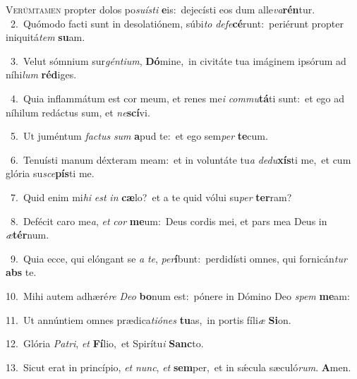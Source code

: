 \lettrine{\initial\textcolor{\initialcolor}{V}}{erúmtamen} propter dolos po\-\textit{su}\-\textit{ís}\textit{ti} \textbf{e}\-is:~\star dejecísti eos dum alle\-\textit{va}\-\textbf{rén}tur.\\
{\numbfont\textcolor{\numbcolor}{~2.}}~Quómodo facti sunt in desolatiónem, súbi\textit{to} \textit{de}\-\textit{fe}\textbf{cé}runt:~\star periérunt propter iniquitá\textit{tem} \textbf{su}\-am.\par
{\numbfont\textcolor{\numbcolor}{~3.}}~Velut sómnium sur\-\textit{gén}\-\textit{ti}\textit{um}, \textbf{Dó}\-mine,~\star in civitáte tua imáginem ipsórum ad níhi\textit{lum} \textbf{réd}\-iges.\par
{\numbfont\textcolor{\numbcolor}{~4.}}~Quia inflammátum est cor meum, et renes me\textit{i} \textit{com}\-\textit{mu}\textbf{tá}ti sunt:~\star et ego ad níhilum redáctus sum, et \textit{ne}\-\textbf{scí}vi.\par
{\numbfont\textcolor{\numbcolor}{~5.}}~Ut juméntum \textit{fac}\-\textit{tus} \textit{sum} \textbf{a}\-pud te:~\star et ego sem\textit{per} \textbf{te}\-cum.\par
{\numbfont\textcolor{\numbcolor}{~6.}}~Tenuísti manum déxteram meam:~\dagger et in voluntáte tu\textit{a} \textit{de}\-\textit{du}\textbf{xís}ti me,~\star et cum glória su\-\textit{sce}\-\textbf{pís}ti me.\par
{\numbfont\textcolor{\numbcolor}{~7.}}~Quid enim mi\textit{hi} \textit{est} \textit{in} \textbf{cæ}\-lo?~\star et a te quid vólui su\textit{per} \textbf{ter}\-ram?\par
{\numbfont\textcolor{\numbcolor}{~8.}}~Defécit caro me\-\textit{a}\-, \textit{et} \textit{cor} \textbf{me}\-um:~\star Deus cordis mei, et pars mea Deus in \textit{æ}\-\textbf{tér}num.\par
{\numbfont\textcolor{\numbcolor}{~9.}}~Quia ecce, qui elóngant se \textit{a} \textit{te}\-, \textit{per}\-\textbf{í}bunt:~\star perdidísti omnes, qui fornicán\textit{tur} \textbf{abs} te.\par
{\numbfont\textcolor{\numbcolor}{10.}}~Mihi autem adhæré\textit{re} \textit{De}\-\textit{o} \textbf{bo}\-num est:~\star pónere in Dómino Deo \textit{spem} \textbf{me}\-am:\par
{\numbfont\textcolor{\numbcolor}{11.}}~Ut annúntiem omnes prædica\-\textit{ti}\-\textit{ó}\textit{nes} \textbf{tu}\-as,~\star in portis fíli\textit{æ} \textbf{Si}\-on.\par
{\numbfont\textcolor{\numbcolor}{12.}}~Glória \textit{Pa}\-\textit{tri}, \textit{et} \textbf{Fí}\-lio,~\star et Spirítu\textit{i} \textbf{Sanc}\-to.\par
{\numbfont\textcolor{\numbcolor}{13.}}~Sicut erat in princípio, \textit{et} \textit{nunc}\-, \textit{et} \textbf{sem}\-per,~\star et in sǽcula sæculó\-\textit{rum}\-. \textbf{A}\-men.\par

